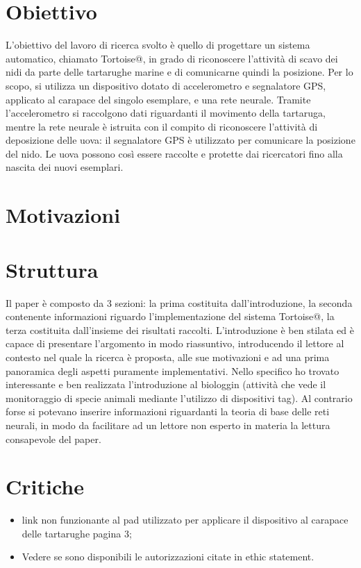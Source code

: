 \documentclass[12pt]{article}
\begin{document}
 		\section{Obiettivo}
 		L'obiettivo del lavoro di ricerca svolto è quello di progettare un sistema automatico, chiamato Tortoise@, in grado di riconoscere l'attività di scavo dei nidi da parte delle tartarughe marine e di comunicarne quindi la posizione.
 		Per lo scopo, si utilizza un dispositivo dotato di accelerometro e segnalatore GPS, applicato al carapace del singolo esemplare, e una rete neurale.
 		Tramite l'accelerometro si raccolgono dati riguardanti il movimento della tartaruga, mentre la rete neurale è istruita con il compito di riconoscere l'attività di deposizione delle uova: il segnalatore GPS è utilizzato per comunicare la posizione del nido. Le uova possono così essere raccolte e protette dai ricercatori fino alla nascita dei nuovi esemplari.
 		\section{Motivazioni}
 		
 		\section{Struttura}
 		Il paper è composto da 3 sezioni: la prima costituita dall'introduzione, la seconda contenente informazioni riguardo l'implementazione del sistema Tortoise@, la terza costituita dall'insieme dei risultati raccolti. L'introduzione è ben stilata ed è capace di presentare l'argomento in modo riassuntivo, introducendo il lettore al contesto nel quale la ricerca è proposta, alle sue motivazioni e ad una prima panoramica degli aspetti puramente implementativi. Nello specifico ho trovato interessante e ben realizzata l'introduzione al biologgin (attività che vede il monitoraggio di specie animali mediante l'utilizzo di dispositivi tag). Al contrario forse si potevano inserire informazioni riguardanti la teoria di base delle reti neurali, in modo da facilitare ad un lettore non esperto in materia la lettura consapevole del paper.
 		\section{Critiche}
 		\begin{itemize}
 			\item link non funzionante al pad utilizzato per applicare il dispositivo al carapace delle tartarughe pagina 3;
 			\item Vedere se sono disponibili le autorizzazioni citate in ethic statement.
 		\end{itemize}
 		
\end{document}
